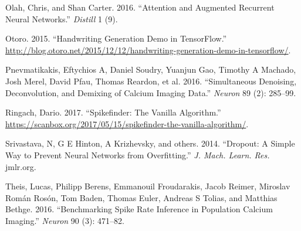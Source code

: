 \documentclass[]{article}
\begin{document}
\hypertarget{ref-Olah2016-be}{}
Olah, Chris, and Shan Carter. 2016. ``Attention and Augmented Recurrent
Neural Networks.'' \emph{Distill} 1 (9).

\hypertarget{ref-Otoro2015-db}{}
Otoro. 2015. ``Handwriting Generation Demo in TensorFlow.''
\url{http://blog.otoro.net/2015/12/12/handwriting-generation-demo-in-tensorflow/}.

\hypertarget{ref-Pnevmatikakis2016-rp}{}
Pnevmatikakis, Eftychios A, Daniel Soudry, Yuanjun Gao, Timothy A
Machado, Josh Merel, David Pfau, Thomas Reardon, et al. 2016.
``Simultaneous Denoising, Deconvolution, and Demixing of Calcium Imaging
Data.'' \emph{Neuron} 89 (2): 285--99.

\hypertarget{ref-Ringach2017-bb}{}
Ringach, Dario. 2017. ``Spikefinder: The Vanilla Algorithm.''
\url{https://scanbox.org/2017/05/15/spikefinder-the-vanilla-algorithm/}.

\hypertarget{ref-Srivastava2014-dc}{}
Srivastava, N, G E Hinton, A Krizhevsky, and others. 2014. ``Dropout: A
Simple Way to Prevent Neural Networks from Overfitting.'' \emph{J. Mach.
Learn. Res.} jmlr.org.

\hypertarget{ref-Theis2016-sc}{}
Theis, Lucas, Philipp Berens, Emmanouil Froudarakis, Jacob Reimer,
Miroslav Román Rosón, Tom Baden, Thomas Euler, Andreas S Tolias, and
Matthias Bethge. 2016. ``Benchmarking Spike Rate Inference in Population
Calcium Imaging.'' \emph{Neuron} 90 (3): 471--82.
\end{document}
